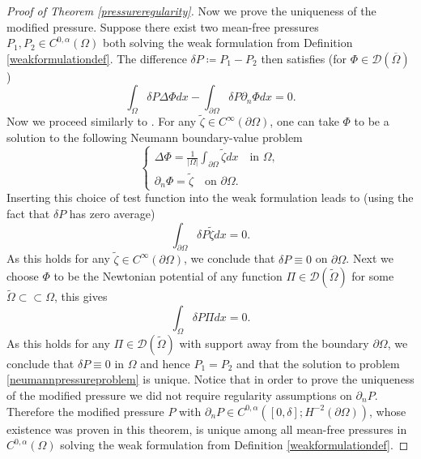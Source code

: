\documentclass[12pt,a4paper]{article}
\theoremstyle{definition}
\theoremstyle{remark}
\numberwithin{equation}{section}
\begin{document}
\begin{proof}[Proof of Theorem \ref{pressureregularity}]
Now we prove the uniqueness of the modified pressure. Suppose there exist two mean-free pressures $P_1, P_2 \in C^{0,\alpha} (\Omega)$ both solving the weak formulation from Definition \ref{weakformulationdef}. The difference $\delta P \coloneqq P_1 - P_2$ then satisfies (for $\Phi \in \mathcal{D} (\overline{\Omega})$)
\begin{equation*}
\int_\Omega \delta P \Delta \Phi dx - \int_{\partial \Omega} \delta P \partial_n \Phi dx = 0.
\end{equation*}
Now we proceed similarly to \cite{quittner}. For any $\widetilde{\zeta} \in C^\infty (\partial \Omega)$, one can take $\Phi$ to be a solution to the following Neumann boundary-value problem
\begin{equation*}
\begin{cases}
\Delta \Phi = \frac{1}{\lvert \Omega \rvert} \int_{\partial \Omega} \widetilde{\zeta} dx \quad \text{in } \Omega, \\
\partial_n \Phi = \widetilde{\zeta} \quad \text{on } \partial \Omega.
\end{cases}
\end{equation*}
Inserting this choice of test function into the weak formulation leads to (using the fact that $\delta P$ has zero average)
\begin{equation*}
\int_{\partial \Omega} \delta P \widetilde{\zeta} dx = 0.
\end{equation*}
As this holds for any $\widetilde{\zeta} \in C^\infty (\partial \Omega)$, we conclude that $\delta P \equiv 0$ on $\partial \Omega$. Next we choose $\Phi$ to be the Newtonian potential of any function $\Pi \in \mathcal{D} (\widetilde{\Omega})$ for some $\widetilde{\Omega} \subset \subset \Omega$, this gives
\begin{equation*}
\int_\Omega \delta P \Pi dx = 0.
\end{equation*}
As this holds for any $\Pi \in \mathcal{D} (\widetilde{\Omega})$ with support away from the boundary $\partial \Omega$, we conclude that $\delta P \equiv 0$ in $\Omega$ and hence $P_1 = P_2$ and that the solution to problem \eqref{neumannpressureproblem} is unique. Notice that in order to prove the uniqueness of the modified pressure we did not require regularity assumptions on $\partial_n P$. Therefore the modified pressure $P$ with $\partial_n P \in C^{0,\alpha} ([0, \delta]; H^{-2} ( \partial \Omega) )$, whose existence was proven in this theorem, is unique among all mean-free pressures in $C^{0,\alpha} (\Omega)$ solving the weak formulation from Definition \ref{weakformulationdef}.
\end{proof}
\end{document}
